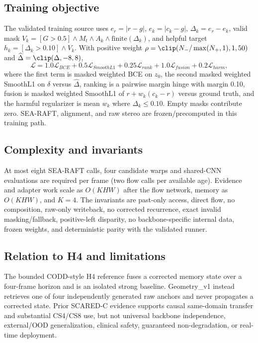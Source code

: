 \subsection{Training objective}
The validated training source uses $e_r=|r-g|$, $e_k=|c_k-g|$, $\Delta_k=e_r-e_k$, valid mask $V_k=[G>0.5]\land M_t\land A_k\land\mathrm{finite}(\Delta_k)$, and helpful target $h_k=[\Delta_k>0.10]\land V_k$. With positive weight $\rho=\clip(N_-/\max(N_+,1),1,50)$ and $\widehat\Delta=\clip(\Delta,-8,8)$,
\[
\mathcal L=1.0\mathcal L_{BCE}+0.5\mathcal L_{SmoothL1}+0.25\mathcal L_{rank}+1.0\mathcal L_{fusion}+0.2\mathcal L_{harm},
\]
where the first term is masked weighted BCE on $z_0$, the second masked weighted SmoothL1 on $\delta$ versus $\widehat\Delta$, ranking is a pairwise margin hinge with margin 0.10, fusion is masked weighted SmoothL1 of $r+w_k(c_k-r)$ versus ground truth, and the harmful regularizer is mean $w_k$ where $\Delta_k\le0.10$. Empty masks contribute zero. SEA-RAFT, alignment, and raw stereo are frozen/precomputed in this training path.

\subsection{Complexity and invariants}
At most eight SEA-RAFT calls, four candidate warps and shared-CNN evaluations are required per frame (two flow calls per available age). Evidence and adapter work scale as $O(KHW)$ after the flow network, memory as $O(KHW)$, and $K=4$. The invariants are past-only access, direct flow, no composition, raw-only writeback, no corrected recurrence, exact invalid masking/fallback, positive-left disparity, no backbone-specific internal data, frozen weights, and deterministic parity with the validated runner.

\subsection{Relation to H4 and limitations}
The bounded CODD-style H4 reference fuses a corrected memory state over a four-frame horizon and is an isolated strong baseline. Geometry\_v1 instead retrieves one of four independently generated raw anchors and never propagates a corrected state. Prior SCARED-C evidence supports causal same-domain transfer and substantial CS4/CS8 use, but not universal backbone independence, external/OOD generalization, clinical safety, guaranteed non-degradation, or real-time deployment.
